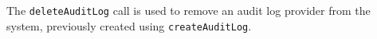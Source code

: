 The \verb+deleteAuditLog+ call is used to remove an audit log provider from the system, previously
created using \verb+createAuditLog+.
